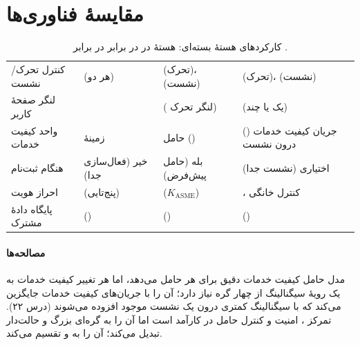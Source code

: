 \documentclass[11pt,a4paper]{article}
\begin{document}
\section{مقایسهٔ فناوری‌ها}
\begin{table}[htbp]
\centering\small
\caption{کارکردهای هستهٔ بسته‌ای: هستهٔ  در  در برابر  در برابر .}\label{tab:core}
\begin{tabularx}{\linewidth}{@{}l Y Y Y@{}}
\toprule
{} &  &  &  \\
\midrule
کنترل تحرک/نشست     &  (هر دو)         &  (تحرک)،  (نشست) &  (تحرک)،  (نشست) \\
لنگر صفحهٔ کاربر    &                  &  ( لنگر تحرک)          &  (یک یا چند) \\
واحد کیفیت خدمات    & زمینهٔ            & حامل  ()             & جریان کیفیت خدمات () درون نشست  \\
 هنگام ثبت‌نام & خیر (فعال‌سازی جدا)       & بله (حامل پیش‌فرض)                       & اختیاری (نشست  جدا) \\
احراز هویت          &  (پنج‌تایی)    &  ($K_{\mathrm{ASME}}$)        & ، کنترل خانگی \\
پایگاه دادهٔ مشترک  &  ()     &  ()               &  () \\
\bottomrule
\end{tabularx}
\end{table}

\paragraph{مصالحه‌ها} مدل حامل کیفیت خدمات دقیق برای هر حامل می‌دهد، اما هر تغییر کیفیت خدمات به یک رویهٔ سیگنالینگ
از چهار گره نیاز دارد؛  آن را با جریان‌های کیفیت خدمات جایگزین می‌کند که با سیگنالینگ کمتری درون یک نشست موجود
افزوده می‌شوند (درس ۲۲). تمرکز ، امنیت و کنترل حامل در  کارآمد است اما آن را به گره‌ای بزرگ و
حالت‌دار تبدیل می‌کند؛  آن را به  و  تقسیم می‌کند.

\end{document}

